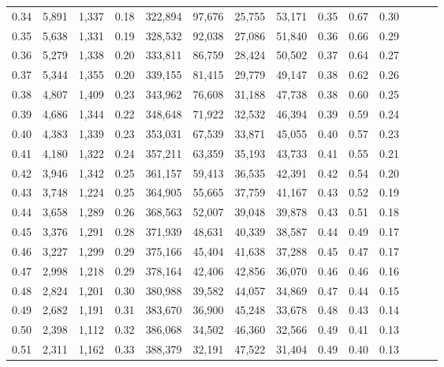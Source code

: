\begin{tabular}{rrrrrrrrrrrrrr}
0.34 &   5,891 &  1,337 &  0.18 &  322,894 &   97,676 &  25,755 &  53,171 &  0.35 &  0.67 &      0.30 \\
0.35 &   5,638 &  1,331 &  0.19 &  328,532 &   92,038 &  27,086 &  51,840 &  0.36 &  0.66 &      0.29 \\
0.36 &   5,279 &  1,338 &  0.20 &  333,811 &   86,759 &  28,424 &  50,502 &  0.37 &  0.64 &      0.27 \\
0.37 &   5,344 &  1,355 &  0.20 &  339,155 &   81,415 &  29,779 &  49,147 &  0.38 &  0.62 &      0.26 \\
0.38 &   4,807 &  1,409 &  0.23 &  343,962 &   76,608 &  31,188 &  47,738 &  0.38 &  0.60 &      0.25 \\
0.39 &   4,686 &  1,344 &  0.22 &  348,648 &   71,922 &  32,532 &  46,394 &  0.39 &  0.59 &      0.24 \\
0.40 &   4,383 &  1,339 &  0.23 &  353,031 &   67,539 &  33,871 &  45,055 &  0.40 &  0.57 &      0.23 \\
0.41 &   4,180 &  1,322 &  0.24 &  357,211 &   63,359 &  35,193 &  43,733 &  0.41 &  0.55 &      0.21 \\
0.42 &   3,946 &  1,342 &  0.25 &  361,157 &   59,413 &  36,535 &  42,391 &  0.42 &  0.54 &      0.20 \\
0.43 &   3,748 &  1,224 &  0.25 &  364,905 &   55,665 &  37,759 &  41,167 &  0.43 &  0.52 &      0.19 \\
0.44 &   3,658 &  1,289 &  0.26 &  368,563 &   52,007 &  39,048 &  39,878 &  0.43 &  0.51 &      0.18 \\
0.45 &   3,376 &  1,291 &  0.28 &  371,939 &   48,631 &  40,339 &  38,587 &  0.44 &  0.49 &      0.17 \\
0.46 &   3,227 &  1,299 &  0.29 &  375,166 &   45,404 &  41,638 &  37,288 &  0.45 &  0.47 &      0.17 \\
0.47 &   2,998 &  1,218 &  0.29 &  378,164 &   42,406 &  42,856 &  36,070 &  0.46 &  0.46 &      0.16 \\
0.48 &   2,824 &  1,201 &  0.30 &  380,988 &   39,582 &  44,057 &  34,869 &  0.47 &  0.44 &      0.15 \\
0.49 &   2,682 &  1,191 &  0.31 &  383,670 &   36,900 &  45,248 &  33,678 &  0.48 &  0.43 &      0.14 \\
0.50 &   2,398 &  1,112 &  0.32 &  386,068 &   34,502 &  46,360 &  32,566 &  0.49 &  0.41 &      0.13 \\
0.51 &   2,311 &  1,162 &  0.33 &  388,379 &   32,191 &  47,522 &  31,404 &  0.49 &  0.40 &      0.13 \\

\end{tabular}
